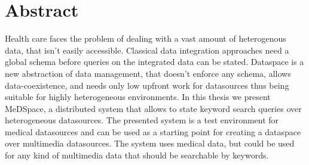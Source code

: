 \chapter*{Abstract}

Health care faces the problem of dealing with a vast amount of heterogenous data, that isn't easily accessible. Classical data integration approaches need a global schema before queries on the integrated data can be stated. Dataspace is a new abstraction of data management, that doesn't enforce any schema, allows data-coexistence, and needs only low upfront work for datasources thus being suitable for highly heterogeneous environments. In this thesis we present MeDSpace, a distributed system that allows to state keyword search queries over heterogeneous datasources. The presented system is a test environment for medical datasources and can be used as a starting point for creating a dataspace over multimedia datasources. The system uses medical data, but could be used for any kind of multimedia data that should be searchable by keywords.